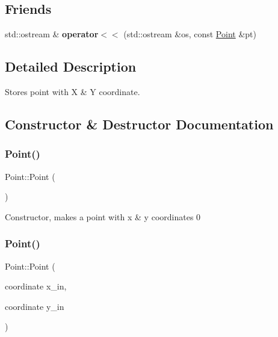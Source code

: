 \subsection*{Friends}
\begin{DoxyCompactItemize}
\item 
\mbox{\label{classPoint_a2c120859855730a5ff9d2eaee48471c5}} 
std\+::ostream \& {\bfseries operator$<$$<$} (std\+::ostream \&os, const \hyperlink{classPoint}{Point} \&pt)
\end{DoxyCompactItemize}


\subsection{Detailed Description}
Stores point with X \& Y coordinate. 

\subsection{Constructor \& Destructor Documentation}
\mbox{\label{classPoint_ad92f2337b839a94ce97dcdb439b4325a}} 
\subsubsection{\texorpdfstring{Point()}{Point()}\hspace{0.1cm}{\footnotesize\ttfamily [1/2]}}
{\footnotesize\ttfamily Point\+::\+Point (\begin{DoxyParamCaption}{ }\end{DoxyParamCaption})}

Constructor, makes a point with x \& y coordinates 0 \mbox{\label{classPoint_af7373698b9fafc53b0a5d06e511642e1}} 
\subsubsection{\texorpdfstring{Point()}{Point()}\hspace{0.1cm}{\footnotesize\ttfamily [2/2]}}
{\footnotesize\ttfamily Point\+::\+Point (\begin{DoxyParamCaption}\item[{coordinate}]{x\+\_\+in,  }\item[{coordinate}]{y\+\_\+in }\end{DoxyParamCaption})}



